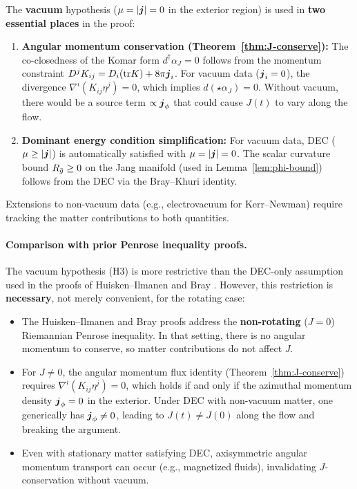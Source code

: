 \begin{remark}\label{rem:vacuum-critical}
The \textbf{vacuum} hypothesis ($\mu = |\boldsymbol{j}| = 0$ in the exterior region) is used in \textbf{two essential places} in the proof:
\begin{enumerate}
    \item \textbf{Angular momentum conservation (Theorem~\ref{thm:J-conserve}):} The co-closedness of the Komar form $d^\dagger\alpha_J = 0$ follows from the momentum constraint $D^j K_{ij} = D_i(\mathrm{tr} K) + 8\pi \boldsymbol{j}_i$. For vacuum data ($\boldsymbol{j}_i = 0$), the divergence $\nabla^i(K_{ij}\eta^j) = 0$, which implies $d(\star\alpha_J) = 0$. Without vacuum, there would be a source term $\propto \boldsymbol{j}_\phi$ that could cause $J(t)$ to vary along the flow.
    
    \item \textbf{Dominant energy condition simplification:} For vacuum data, DEC ($\mu \geq |\boldsymbol{j}|$) is automatically satisfied with $\mu = |\boldsymbol{j}| = 0$. The scalar curvature bound $R_{\bar{g}} \geq 0$ on the Jang manifold (used in Lemma~\ref{lem:phi-bound}) follows from the DEC via the Bray--Khuri identity.
\end{enumerate}
Extensions to non-vacuum data (e.g., electrovacuum for Kerr--Newman) require tracking the matter contributions to both quantities.

\paragraph{Comparison with prior Penrose inequality proofs.}
The vacuum hypothesis (H3) is more restrictive than the DEC-only assumption used in the proofs of Huisken--Ilmanen \cite{huisken2001} and Bray \cite{bray2001}. However, this restriction is \textbf{necessary}, not merely convenient, for the rotating case:
\begin{itemize}
    \item The Huisken--Ilmanen and Bray proofs address the \textbf{non-rotating} ($J=0$) Riemannian Penrose inequality. In that setting, there is no angular momentum to conserve, so matter contributions do not affect $J$.
    \item For $J \neq 0$, the angular momentum flux identity (Theorem~\ref{thm:J-conserve}) requires $\nabla^i(K_{ij}\eta^j) = 0$, which holds if and only if the azimuthal momentum density $\boldsymbol{j}_\phi = 0$ in the exterior. Under DEC with non-vacuum matter, one generically has $\boldsymbol{j}_\phi \neq 0$, leading to $J(t) \neq J(0)$ along the flow and breaking the argument.
    \item Even with stationary matter satisfying DEC, axisymmetric angular momentum transport can occur (e.g., magnetized fluids), invalidating $J$-conservation without vacuum.
\end{itemize}


\end{remark}
